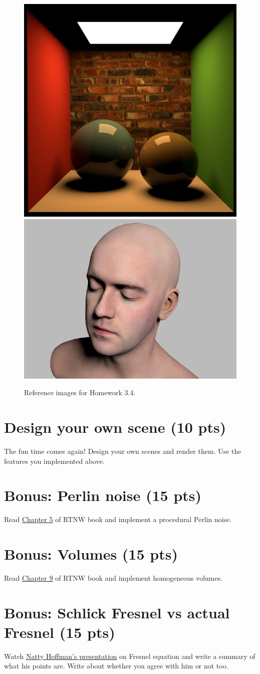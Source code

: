 \begin{figure}[ht]
    \centering
    \includegraphics[width=0.4\linewidth]{imgs/hw_3_4a.png}
    \includegraphics[width=0.4\linewidth]{imgs/hw_3_4b.png}
    \caption{Reference images for Homework 3.4.}
    \label{fig:hw_3_4}
\end{figure}

\section{Design your own scene (10 pts)}
The fun time comes again! Design your own scenes and render them. Use the features you implemented above.

\section{Bonus: Perlin noise (15 pts)}
Read \href{https://raytracing.github.io/books/RayTracingTheNextWeek.html#perlinnoise}{Chapter 5} of RTNW book and implement a procedural Perlin noise.

\section{Bonus: Volumes (15 pts)}
Read \href{https://raytracing.github.io/books/RayTracingTheNextWeek.html#volumes}{Chapter 9} of RTNW book and implement homogeneous volumes.

\section{Bonus: Schlick Fresnel vs actual Fresnel (15 pts)}
Watch \href{https://www.youtube.com/watch?v=kEcDbl7eS0w}{Natty Hoffman's presentation} on Fresnel equation and write a summary of what his points are. Write about whether you agree with him or not too.

